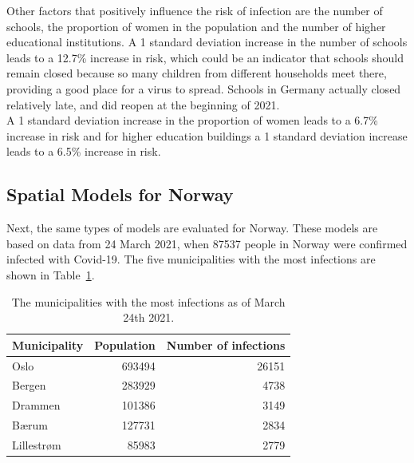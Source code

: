 Other factors that positively influence the risk of infection are the number of schools, the proportion of women in the population and the number of higher educational institutions. A 1 standard deviation increase in the number of schools leads to a 12.7\% increase in risk, which could be an indicator that schools should remain closed because so many children from different households meet there, providing a good place for a virus to spread. Schools in Germany actually closed relatively late, and did reopen at the beginning of 2021.\\
A 1 standard deviation increase in the proportion of women leads to a 6.7\% increase in risk and for higher education buildings a 1 standard deviation increase leads to a 6.5\% increase in risk. 
\subsection{Spatial Models for Norway}
Next, the same types of models are evaluated for Norway. These models are based on data from 24 March 2021, when 87537 people in Norway were confirmed infected with Covid-19. The five municipalities with the most infections are shown in Table~\ref{top5norway}.
\begin{table}[H] 
\caption{The municipalities with the most infections as of March 24th 2021. \label{top5norway}}
\begin{tabular}{l r r}
\toprule
\textbf{Municipality}	& \textbf{Population}	& \textbf{Number of infections} \\
\midrule
Oslo & 693494 & 26151 \\
Bergen & 283929 & 4738 \\
Drammen & 101386 & 3149 \\
Bærum & 127731 & 2834 \\
Lillestrøm & 85983 & 2779 \\
\bottomrule
\end{tabular}
\end{table}
